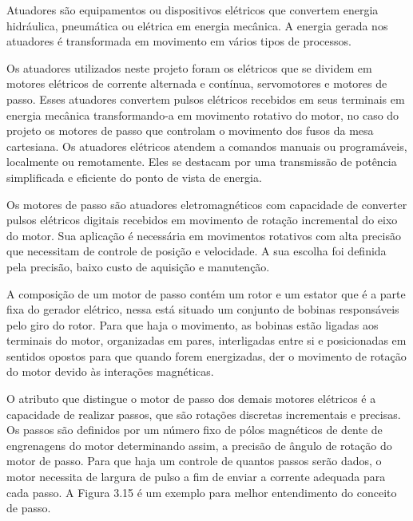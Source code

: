 Atuadores são equipamentos ou dispositivos elétricos que convertem energia hidráulica, pneumática ou elétrica em energia 
mecânica. A energia gerada nos atuadores é transformada em movimento em vários tipos de processos.

Os atuadores utilizados neste projeto foram os elétricos que se dividem em  motores elétricos de corrente alternada 
e contínua, servomotores e motores de passo. Esses atuadores convertem pulsos elétricos recebidos em seus terminais 
em energia mecânica transformando-a em movimento rotativo do motor, no caso do projeto os motores de passo que controlam 
o movimento dos fusos da mesa cartesiana. Os atuadores elétricos atendem a comandos manuais ou programáveis, localmente 
ou remotamente. Eles se destacam por uma transmissão de potência simplificada e eficiente do ponto de vista de energia.

Os motores de passo são atuadores eletromagnéticos com capacidade de converter pulsos elétricos digitais recebidos em 
movimento de rotação incremental do eixo do motor. Sua aplicação é necessária em movimentos rotativos com alta precisão 
que necessitam de controle de posição e velocidade. A sua escolha foi definida pela precisão, baixo custo de aquisição 
e manutenção.

A composição de um motor de passo contém um rotor e um estator que é a parte fixa do gerador elétrico, nessa está 
situado um conjunto de bobinas responsáveis pelo giro do rotor. Para que haja o movimento, as bobinas estão ligadas 
aos terminais do motor, organizadas em pares, interligadas entre si e posicionadas em sentidos opostos para que 
quando forem energizadas, der o movimento de rotação do motor devido às interações magnéticas.

O atributo que distingue o motor de passo dos demais motores elétricos é a capacidade de realizar passos, que são 
rotações discretas incrementais e precisas. Os passos são definidos por um número fixo de pólos magnéticos de dente 
de engrenagens do motor determinando assim, a precisão de ângulo de rotação do motor de passo. Para que haja um 
controle de quantos passos serão dados, o motor necessita de largura de pulso a fim de enviar a corrente adequada 
para cada passo. A Figura 3.15 é um exemplo para melhor entendimento do conceito de passo.

